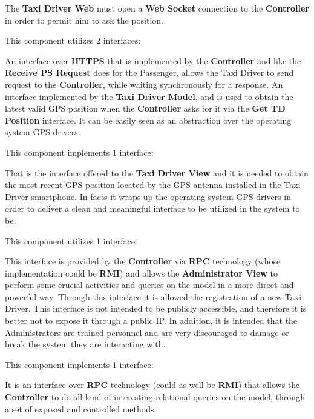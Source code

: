 \begin{itemize}
\begin{itemize}
		The \textbf{Taxi Driver Web} must open a \textbf{Web Socket} connection to the \textbf{Controller} in order to permit him to ask the position.
	\end{itemize}
	This component utilizes 2 interfaces:
	\begin{itemize}
		 An interface over \textbf{HTTPS} that is implemented by the \textbf{Controller} and like the \textbf{Receive PS Request} does for the Passenger, allows the Taxi Driver to send request to the \textbf{Controller}, while waiting synchronously for a response.
		 An interface implemented by the \textbf{Taxi Driver Model}, and is used to obtain the latest valid GPS position when the \textbf{Controller} asks for it via the \textbf{Get TD Position} interface.
		It can be easily seen as an abstraction over the operating system GPS drivers.
	\end{itemize}
	\itemBold{Taxi Driver Model}
	This component implements 1 interface:
	\begin{itemize}
		 That is the interface offered to the \textbf{Taxi Driver View} and it is needed to obtain the most recent GPS position located by the GPS antenna installed in the Taxi Driver smartphone.
		In facts it wraps up the operating system GPS drivers in order to deliver a clean and meaningful interface to be utilized in the system to be.
	\end{itemize}
	\itemBold{Administration View}
	This component utilizes 1 interface:
	\begin{itemize}
		 This interface is provided by the \textbf{Controller} via \textbf{RPC} technology (whose implementation could be \textbf{RMI}) and allows the \textbf{Administrator View} to perform some crucial activities and queries on the \myTaxiService{} model in a more direct and powerful way. Through this interface it is allowed the registration of a new Taxi Driver.
		This interface is not intended to be publicly accessible, and therefore it is better not to expose it through a public IP.
		In addition, it is intended that the Administrators are trained personnel and are very discouraged to damage or break the system they are interacting with.
	\end{itemize}
	\itemBold{Model}
	This component implements 1 interface:
	\begin{itemize}
		 It is an interface over \textbf{RPC} technology (could as well be \textbf{RMI}) that allows the \textbf{Controller} to do all kind of interesting relational queries on the \myTaxiService{} model, through a set of exposed and controlled methods.

\end{itemize}
\end{itemize}
